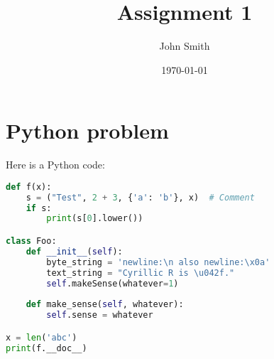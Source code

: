 \documentclass{classic}
\institute{University of Caen}
\date{\today}
\author{John Smith}
\title{Assignment 1}
\begin{document}
\thispagestyle{plain}

\makeheader

\section{Python problem}

Here is a Python code:

\begin{lstlisting}[language=Python]
def f(x):
	s = ("Test", 2 + 3, {'a': 'b'}, x)  # Comment
	if s:
		print(s[0].lower())

class Foo:
	def __init__(self):
		byte_string = 'newline:\n also newline:\x0a'
		text_string = "Cyrillic R is \u042f."
		self.makeSense(whatever=1)
	
	def make_sense(self, whatever):
		self.sense = whatever

x = len('abc')
print(f.__doc__)
\end{lstlisting}

\lipsum[1]
\end{document}
